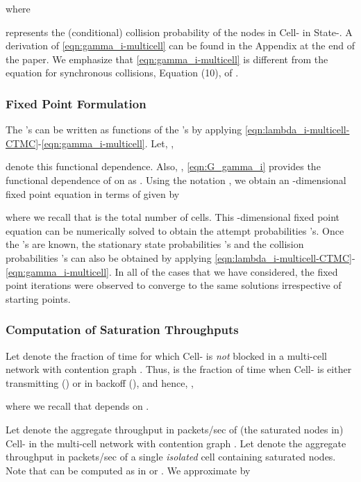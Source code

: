 \documentclass[10pt,a4paper,journal]{IEEEtran}
\theoremstyle{definition}
\theoremstyle{remark}
\theoremstyle{plain}
\begin{document}
where 
 
represents the (conditional) collision probability of the nodes in Cell- in State-. A derivation of \eqref{eqn:gamma_i-multicell} can be found in the Appendix at the end of the paper. We emphasize that \eqref{eqn:gamma_i-multicell} is different from the equation for synchronous collisions, Equation (10), of \cite{wanet.garetto_etal08starvation}. 








\subsubsection{Fixed Point Formulation}
\label{subsubsec:fixed-point-formulation}

The 's can be written as functions of the 's by applying \eqref{eqn:lambda_i-multicell-CTMC}-\eqref{eqn:gamma_i-multicell}. Let, , 
 
denote this functional dependence. Also, , \eqref{eqn:G_gamma_i} provides the functional dependence of  on  as . Using the notation , we obtain an -dimensional fixed point equation in terms of  given by 
 
where we recall that  is the total number of cells. This -dimensional fixed point equation can be numerically solved to obtain the attempt probabilities 's. Once the 's are known, the stationary state probabilities 's and the collision probabilities 's can also be obtained by applying \eqref{eqn:lambda_i-multicell-CTMC}-\eqref{eqn:gamma_i-multicell}. In all of the cases that we have considered, the fixed point iterations were observed to converge to the same solutions irrespective of starting points.



\subsubsection{Computation of Saturation Throughputs}
\label{subsubsec:computing-cell-throughputs}

Let  denote the fraction of time for which Cell- is \textit{not} blocked in a multi-cell network with contention graph . Thus,  is the fraction of time when Cell- is either transmitting () or in backoff (), and hence, , 

where we recall that  depends on . 

Let  denote the aggregate throughput in packets/sec of (the  saturated nodes in) Cell- in the multi-cell network with contention graph . Let  denote the aggregate throughput in packets/sec of a single \textit{isolated} cell containing  saturated nodes. Note that  can be computed as in \cite{wanet.bianchi00performance} or \cite{wanet.kumar_etal07new_insights}. We approximate  by 
 
\end{document}
